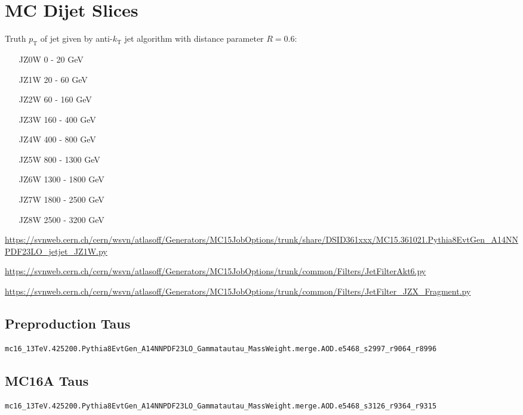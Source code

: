 \section{MC Dijet Slices}
Truth $p_\mathrm{T}$ of jet given by anti-$k_\mathrm{T}$ jet algorithm with distance parameter $R=0.6$:
\begin{itemize}
\item[JZ0W] 0 - 20 GeV
\item[JZ1W] 20 - 60 GeV
\item[JZ2W] 60 - 160 GeV
\item[JZ3W] 160 - 400 GeV
\item[JZ4W] 400 - 800 GeV
\item[JZ5W] 800 - 1300 GeV
\item[JZ6W] 1300 - 1800 GeV
\item[JZ7W] 1800 - 2500 GeV
\item[JZ8W] 2500 - 3200 GeV
\end{itemize}

\url{https://svnweb.cern.ch/cern/wsvn/atlasoff/Generators/MC15JobOptions/trunk/share/DSID361xxx/MC15.361021.Pythia8EvtGen_A14NNPDF23LO_jetjet_JZ1W.py}


\url{https://svnweb.cern.ch/cern/wsvn/atlasoff/Generators/MC15JobOptions/trunk/common/Filters/JetFilterAkt6.py}


\url{https://svnweb.cern.ch/cern/wsvn/atlasoff/Generators/MC15JobOptions/trunk/common/Filters/JetFilter_JZX_Fragment.py}

\subsection{Preproduction Taus}

\begin{lstlisting}[basicstyle=\small\ttfamily, breaklines=true]
  mc16_13TeV.425200.Pythia8EvtGen_A14NNPDF23LO_Gammatautau_MassWeight.merge.AOD.e5468_s2997_r9064_r8996
\end{lstlisting}

\subsection{MC16A Taus}

\begin{lstlisting}[basicstyle=\small\ttfamily, breaklines=true]
  mc16_13TeV.425200.Pythia8EvtGen_A14NNPDF23LO_Gammatautau_MassWeight.merge.AOD.e5468_s3126_r9364_r9315
\end{lstlisting}

